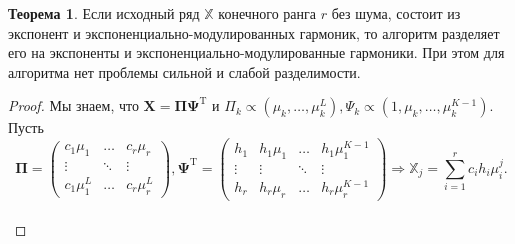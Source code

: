 \documentclass[specialist,
               substylefile = spbu_report.rtx,
               subf,href,colorlinks=true, 12pt]{disser}
\theoremstyle{definition}
\newtheorem{theorem}{Теорема}
\begin{document}
\begin{theorem}
Если исходный ряд $\mathbb{X}$ конечного ранга $r$ без шума, состоит из экспонент и экспоненциально-модулированных гармоник, то алгоритм разделяет его на экспоненты и экспоненциально-модулированные гармоники. При этом для алгоритма нет проблемы сильной и слабой разделимости.
\end{theorem}
\begin{proof}
Мы знаем, что $\mathbf{X} = \mathbf{\Pi\Psi}^{\mathrm{T}}$ и $\Pi_k \propto (\mu_k, \dots ,\mu^L_k), \Psi_k \propto (1, \mu_k, \dots ,\mu^{K-1}_k)$. Пусть 
\begin{equation*}\
    \mathbf{\Pi} = \begin{pmatrix}
        c_1\mu_1 & \dots & c_r\mu_r \\
        \vdots & \ddots & \vdots \\
        c_1\mu_1^L & \dots & c_r\mu_r^L
    \end{pmatrix}, \mathbf{\Psi}^{\mathrm{T}} = 
    \begin{pmatrix}
        h_1 & h_1\mu_1 & \dots & h_1\mu_1^{K - 1} \\
        \vdots & \vdots & \ddots & \vdots \\
        h_r & h_r\mu_r & \dots & h_r\mu_r^{K - 1}
    \end{pmatrix} \Rightarrow  \mathbb{X}_j = \sum_{i = 1}^{r}c_i h_i \mu_i^j.
\end{equation*} \\



\end{proof}
\end{document}
